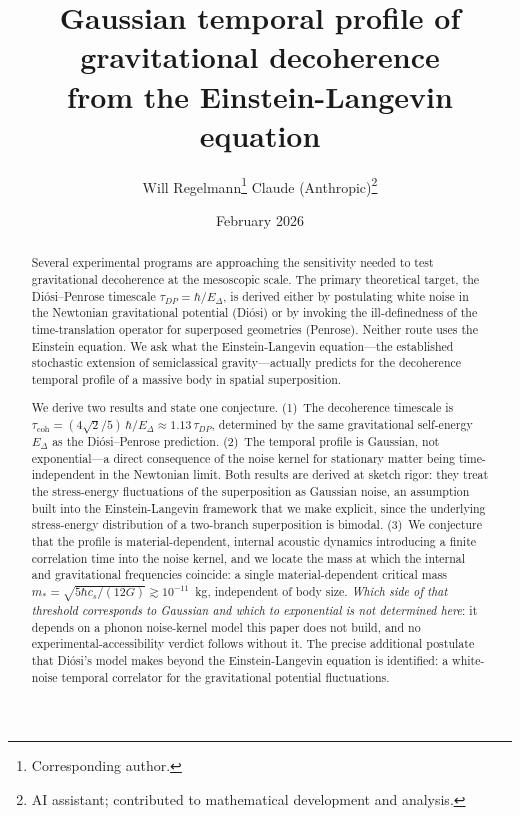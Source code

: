 \documentclass[12pt,a4paper]{article}
\title{\textbf{Gaussian temporal profile of gravitational decoherence\\[6pt]
from the Einstein-Langevin equation}}
\author{Will Regelmann\thanks{Corresponding author.} \quad Claude (Anthropic)\thanks{AI
assistant; contributed to mathematical development and analysis.}}
\date{February 2026}
\theoremstyle{remark}
\begin{document}
\maketitle

\begin{abstract}
Several experimental programs are approaching the sensitivity needed to test gravitational
decoherence at the mesoscopic scale. The primary theoretical target, the
Di\'osi--Penrose timescale $\tau_{DP} = \hbar/E_\Delta$, is derived either by postulating
white noise in the Newtonian gravitational potential (Di\'osi) or by invoking the
ill-definedness of the time-translation operator for superposed geometries (Penrose).
Neither route uses the Einstein equation. We ask what the Einstein-Langevin
equation---the established stochastic extension of semiclassical gravity---actually
predicts for the decoherence temporal profile of a massive body in spatial superposition.

We derive two results and state one conjecture. (1)~The decoherence timescale is
$\tau_{\text{coh}} = (4\sqrt{2}/5)\,\hbar/E_\Delta \approx 1.13\,\tau_{DP}$, determined by
the same gravitational self-energy $E_\Delta$ as the Di\'osi--Penrose prediction. (2)~The
temporal profile is Gaussian, not exponential---a direct consequence of the noise kernel
for stationary matter being time-independent in the Newtonian limit. Both results are
derived at sketch rigor: they treat the stress-energy fluctuations of the superposition as
Gaussian noise, an assumption built into the Einstein-Langevin framework that we make
explicit, since the underlying stress-energy distribution of a two-branch superposition is
bimodal. (3)~We conjecture that the profile is material-dependent, internal acoustic dynamics
introducing a finite correlation time into the noise kernel, and we locate the mass at
which the internal and gravitational frequencies coincide: a single material-dependent
critical mass $m_\ast=\sqrt{5\hbar c_s/(12G)}\gtrsim10^{-11}$~kg, independent of body
size. \emph{Which side of that threshold corresponds to Gaussian and which to
exponential is not determined here}: it depends on a phonon noise-kernel model this paper
does not build, and no experimental-accessibility verdict follows without it. The precise
additional postulate that Di\'osi's model makes beyond the
Einstein-Langevin equation is identified: a white-noise temporal correlator for the
gravitational potential fluctuations.
\end{abstract}

\end{document}
